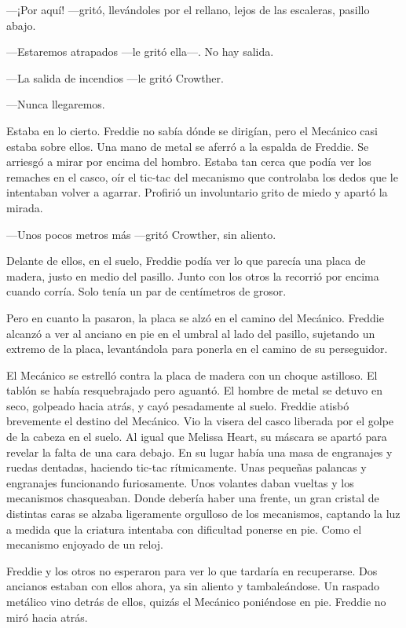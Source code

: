 {---¡Por aquí! ---gritó, llevándoles por el rellano, lejos de las
escaleras, pasillo abajo.}

{---Estaremos atrapados ---le gritó ella---. No hay salida.}

{---La salida de incendios ---le gritó Crowther.}

{---Nunca llegaremos.}

{Estaba en lo cierto. Freddie no sabía dónde se dirigían, pero el
	Mecánico casi estaba sobre ellos. Una mano de metal se aferró a la
	espalda de Freddie. Se arriesgó a mirar por encima del hombro. Estaba
	tan cerca que podía ver los remaches en el casco, oír el tic-tac del
	mecanismo que controlaba los dedos que le intentaban volver a agarrar.
Profirió un involuntario grito de miedo y apartó la mirada.}

{---Unos pocos metros más ---gritó Crowther, sin aliento.}

{Delante de ellos, en el suelo, Freddie podía ver lo que parecía una
	placa de madera, justo en medio del pasillo. Junto con los otros la
	recorrió por encima cuando corría. Solo tenía un par de centímetros de
grosor.}

{Pero en cuanto la pasaron, la placa se alzó en el camino del Mecánico.
	Freddie alcanzó a ver al anciano en pie en el umbral al lado del
	pasillo, sujetando un extremo de la placa, levantándola para ponerla en
el camino de su perseguidor.}

{El Mecánico se estrelló contra la placa de madera con un choque
	astilloso. El tablón se había resquebrajado pero aguantó. El hombre de
	metal se detuvo en seco, golpeado hacia atrás, y cayó pesadamente al
	suelo. Freddie atisbó brevemente el destino del Mecánico. Vio la visera
	del casco liberada por el golpe de la cabeza en el suelo. Al igual que
	Melissa Heart, su máscara se apartó para revelar la falta de una cara
	debajo. En su lugar había una masa de engranajes y ruedas dentadas,
	haciendo tic-tac rítmicamente. Unas pequeñas palancas y engranajes
	funcionando furiosamente. Unos volantes daban vueltas y los mecanismos
	chasqueaban. Donde debería haber una frente, un gran cristal de
	distintas caras se alzaba ligeramente orgulloso de los mecanismos,
	captando la luz a medida que la criatura intentaba con dificultad
ponerse en pie. Como el mecanismo enjoyado de un reloj.}

{Freddie y los otros no esperaron para ver lo que tardaría en
	recuperarse. Dos ancianos estaban con ellos ahora, ya sin aliento y
	tambaleándose. Un raspado metálico vino detrás de ellos, quizás el
Mecánico poniéndose en pie. Freddie no miró hacia atrás.}

